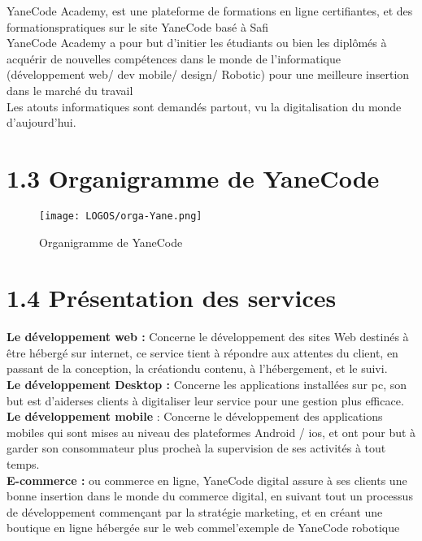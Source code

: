 YaneCode Academy, est une plateforme de formations en ligne certifiantes, et des
formationspratiques sur le site YaneCode basé à Safi\\

YaneCode Academy a pour but d’initier les étudiants ou bien les diplômés à acquérir de nouvelles compétences dans le monde de l’informatique (développement web/ dev mobile/ design/ Robotic) pour une meilleure insertion dans le marché du travail\\

Les atouts informatiques sont demandés partout, vu la digitalisation du monde
d’aujourd’hui.\\



\section*{1.3 Organigramme de YaneCode}

\begin{figure}[h]
\centering
\texttt{[image: LOGOS/orga-Yane.png]}
\caption{Organigramme de YaneCode}
\label{fig:image-label}
\end{figure}
\clearpage

\section*{1.4 Présentation des services }

\textbf{Le développement web :} 
Concerne le développement des sites Web destinés à être hébergé sur internet, ce service tient à répondre aux attentes du client, en passant de la conception, la créationdu contenu, à l’hébergement, et le suivi.\\

\textbf{Le développement Desktop :}
 Concerne les applications installées sur pc, son but est d’aiderses clients à digitaliser leur service pour une gestion plus efficace.\\
 
\textbf{Le développement mobile }
: Concerne le développement des applications mobiles qui
sont mises au niveau des plateformes Android / ios, et ont pour but à garder son consommateur plus procheà la supervision de ses activités à tout temps.\\

\textbf{E-commerce :}
 ou commerce en ligne, YaneCode digital assure à ses clients une bonne insertion dans le monde du commerce digital, en suivant tout un processus de développement commençant par la stratégie marketing, et en créant une boutique en ligne hébergée sur le web commel’exemple de YaneCode robotique\\
 
